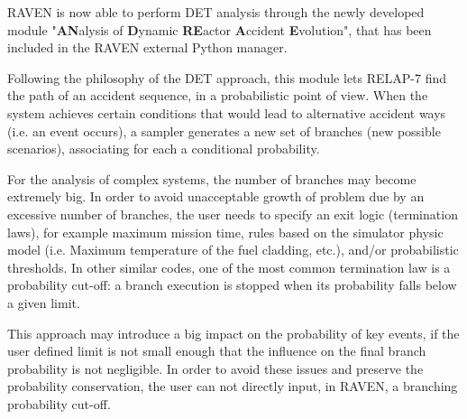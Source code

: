 \label{sec:DETRavenApproach}
RAVEN is now able to perform DET analysis through the newly developed module "\textbf{AN}alysis of \textbf{D}ynamic \textbf{RE}actor \textbf{A}ccident \textbf{E}volution", that has been included in the RAVEN external Python manager. 

Following the philosophy of the DET approach, this module lets RELAP-7 find the path of an accident sequence, in a probabilistic point of view. When the system achieves certain conditions that would lead to alternative accident ways (i.e. an event occurs), a sampler generates a new set of branches (new possible scenarios), associating for each a conditional probability.  

For the analysis of complex systems, the number of branches may become extremely big. In order to avoid unacceptable growth of problem due by an excessive number of branches, the user needs to specify an exit logic (termination laws), for example maximum mission time, rules based on the simulator physic model (i.e. Maximum temperature of the fuel cladding, etc.), and/or probabilistic thresholds. In other similar codes, one of the most common termination law is a probability cut-off: a branch execution is stopped when its probability falls below a given limit. 
 
This approach may introduce a big impact on the probability of key events, if the user defined limit is not small enough that the influence on the final branch probability is not negligible.  In order to avoid these issues and preserve the probability conservation, the user can not directly input, in RAVEN, a branching probability cut-off. 

